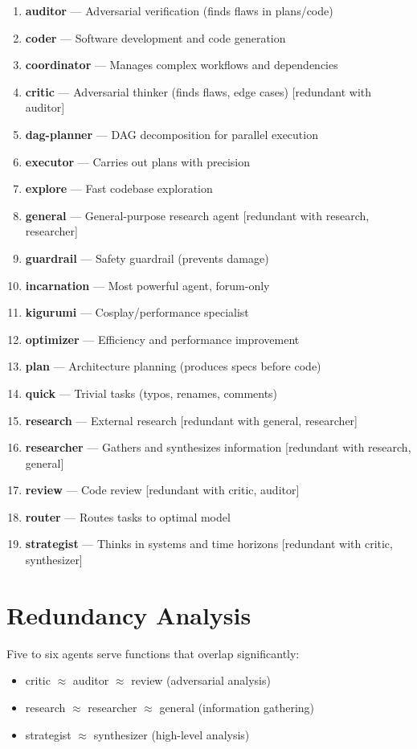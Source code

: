 \documentclass[12pt,a4paper,oneside]{book}
\begin{document}
\begin{enumerate}
  \item \textbf{auditor} --- Adversarial verification (finds flaws in plans/code)
  \item \textbf{coder} --- Software development and code generation
  \item \textbf{coordinator} --- Manages complex workflows and dependencies
  \item \textbf{critic} --- Adversarial thinker (finds flaws, edge cases) [redundant with auditor]
  \item \textbf{dag-planner} --- DAG decomposition for parallel execution
  \item \textbf{executor} --- Carries out plans with precision
  \item \textbf{explore} --- Fast codebase exploration
  \item \textbf{general} --- General-purpose research agent [redundant with research, researcher]
  \item \textbf{guardrail} --- Safety guardrail (prevents damage)
  \item \textbf{incarnation} --- Most powerful agent, forum-only
  \item \textbf{kigurumi} --- Cosplay/performance specialist
  \item \textbf{optimizer} --- Efficiency and performance improvement
  \item \textbf{plan} --- Architecture planning (produces specs before code)
  \item \textbf{quick} --- Trivial tasks (typos, renames, comments)
  \item \textbf{research} --- External research [redundant with general, researcher]
  \item \textbf{researcher} --- Gathers and synthesizes information [redundant with research, general]
  \item \textbf{review} --- Code review [redundant with critic, auditor]
  \item \textbf{router} --- Routes tasks to optimal model
  \item \textbf{strategist} --- Thinks in systems and time horizons [redundant with critic, synthesizer]
\end{enumerate}

\section{Redundancy Analysis}

Five to six agents serve functions that overlap significantly:
\begin{itemize}
  \item critic $\approx$ auditor $\approx$ review (adversarial analysis)
  \item research $\approx$ researcher $\approx$ general (information gathering)
  \item strategist $\approx$ synthesizer (high-level analysis)
\end{itemize}
\end{document}
